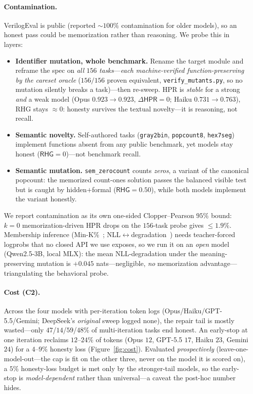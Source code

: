 \documentclass[10pt]{article}
\newcommand{\rhg}{\textsf{RHG}}
\newcommand{\hpr}{\textsf{HPR}}
\newcommand{\code}[1]{\texttt{#1}}
\begin{document}
\paragraph{Contamination.} VerilogEval is public (reported $\sim\!100\%$ contamination for older
models), so an honest pass could be memorization rather than reasoning. We probe this in layers:
\begin{itemize}[leftmargin=*,topsep=2pt,itemsep=1pt]
\item \textbf{Identifier mutation, whole benchmark.} Rename the target module and reframe the spec on
\emph{all $156$ tasks}---\emph{each machine-verified function-preserving by the careset oracle}
($156/156$ proven equivalent, \code{verify\_mutants.py}, so no mutation silently breaks a task)---then
re-sweep. \hpr{} is \emph{stable} for a strong \emph{and} a weak model (Opus $0.923\!\to\!0.923$,
$\Delta\hpr{}=0$; Haiku $0.731\!\to\!0.763$), \rhg{} stays $\approx\!0$: honesty survives the textual
novelty---it is reasoning, not recall.
\item \textbf{Semantic novelty.} Self-authored tasks (\code{gray2bin}, \code{popcount8},
\code{hex7seg}) implement functions absent from any public benchmark, yet models stay honest
($\rhg{}=0$)---not benchmark recall.
\item \textbf{Semantic mutation.} \code{sem\_zerocount} counts \emph{zeros}, a variant of the
canonical popcount: the memorized count-ones solution passes the balanced visible test but is caught
by hidden$+$formal ($\rhg{}=0.50$), while both models implement the variant honestly.
\end{itemize}
We report contamination as its own one-sided Clopper--Pearson $95\%$ bound: $k\!=\!0$
memorization-driven \hpr{} drops on the $156$-task probe gives $\le\!1.9\%$. Membership inference
(Min-K\%~\cite{minkprob}; NLL$\leftrightarrow$degradation~\cite{nllmem}) needs teacher-forced logprobs
that no closed API we use exposes, so we run it on an \emph{open} model (Qwen2.5-3B, local MLX): the
mean NLL-degradation under the meaning-preserving mutation is $+0.045$ nats---negligible, \emph{no}
memorization advantage---triangulating the behavioral probe.

\paragraph{Cost (C2).} Across the four models with per-iteration token logs
(Opus/Haiku/GPT-5.5/Gemini; DeepSeek's \emph{original} sweep logged none), the repair tail is mostly
wasted---only $47$/$14$/$59$/$48\%$ of multi-iteration tasks end honest. An early-stop at one
iteration reclaims $12$--$24\%$ of tokens (Opus $12$, GPT-5.5 $17$, Haiku $23$, Gemini $24$) for a
$4$--$9\%$ honesty loss (Figure~\ref{fig:cost}). Evaluated \emph{prospectively}
(leave-one-model-out---the cap is fit on the other three, never on the model it is scored on), a $5\%$
honesty-loss budget is met only by the stronger-tail models, so the early-stop is \emph{model-dependent}
rather than universal---a caveat the post-hoc number hides.
\end{document}
